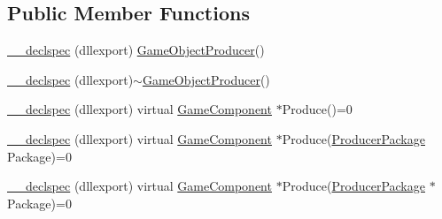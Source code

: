 \subsection*{Public Member Functions}
\begin{DoxyCompactItemize}
\item 
\hyperlink{class_game_object_producer_acedff5955f510b5b40ad477b6c016c1d}{\-\_\-\-\_\-declspec} (dllexport) \hyperlink{class_game_object_producer}{Game\-Object\-Producer}()
\item 
\hyperlink{class_game_object_producer_a27d8c68cd2ba92108dcb57f8dabca382}{\-\_\-\-\_\-declspec} (dllexport)$\sim$\hyperlink{class_game_object_producer}{Game\-Object\-Producer}()
\item 
\hyperlink{class_game_object_producer_a196e596ce8c691618375db29e4b6417a}{\-\_\-\-\_\-declspec} (dllexport) virtual \hyperlink{class_game_component}{Game\-Component} $\ast$Produce()=0
\item 
\hyperlink{class_game_object_producer_a482128af1d260a085d855b2eb4fdf024}{\-\_\-\-\_\-declspec} (dllexport) virtual \hyperlink{class_game_component}{Game\-Component} $\ast$Produce(\hyperlink{class_producer_package}{Producer\-Package} Package)=0
\item 
\hyperlink{class_game_object_producer_a44a6d64e3232301b3cd6ee4166204edb}{\-\_\-\-\_\-declspec} (dllexport) virtual \hyperlink{class_game_component}{Game\-Component} $\ast$Produce(\hyperlink{class_producer_package}{Producer\-Package} $\ast$Package)=0
\end{DoxyCompactItemize}


